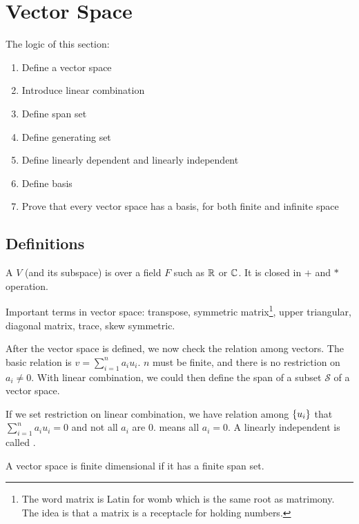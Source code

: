 \chapter{Vector Space}

The logic of this section:
\begin{enumerate}
    \item Define a vector space
    \item Introduce linear combination
    \item Define span set
    \item Define generating set
    \item Define linearly dependent and linearly independent
    \item Define basis
    \item Prove that every vector space has a basis, for both finite and infinite space
\end{enumerate}

\section{Definitions}

\begin{definition}
    A  $V$ (and its subspace) is over a field $F$ such as $\mathbb{R}$ or $\mathbb{C}$. It is closed in $+$ and $*$ operation.
\end{definition}




Important terms in vector space: transpose, symmetric matrix\footnote{The word matrix is Latin for womb which is the same root as matrimony. The idea is that a matrix is a receptacle for holding numbers.}, upper triangular, diagonal matrix, trace, skew symmetric.

After the vector space is defined, we now check the relation among vectors. The basic relation is  $v = \sum_{i=1}^{n} a_i u_i$. $n$ must be finite, and there is no restriction on $a_i \neq 0$. With linear combination, we could then define the span of a subset $\mathcal{S}$ of a vector space. 

If we set restriction on linear combination, we have  relation among $\set{u_i}$ that $\sum_{i=1}^{n} a_i u_i = 0$ and not all $a_i$ are $0$.  means all $a_i = 0$. A linearly independent  is called .


A vector space is finite dimensional if it has a finite span set.


